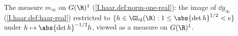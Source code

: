 The measure $m_\infty$ on $G(\R)^1$ (\cref{I.haar.def:norm-one-real}): the image of $\dd g_\infty$ (\cref{I.haar.def:haar-real}) restricted to $\{h\in\GL_2(\R):1\le\abs{\det h}^{1/2}<e\}$ under $h\mapsto\abs{\det h}^{-1/2}h$, viewed as a measure on $G(\R)^1$.

